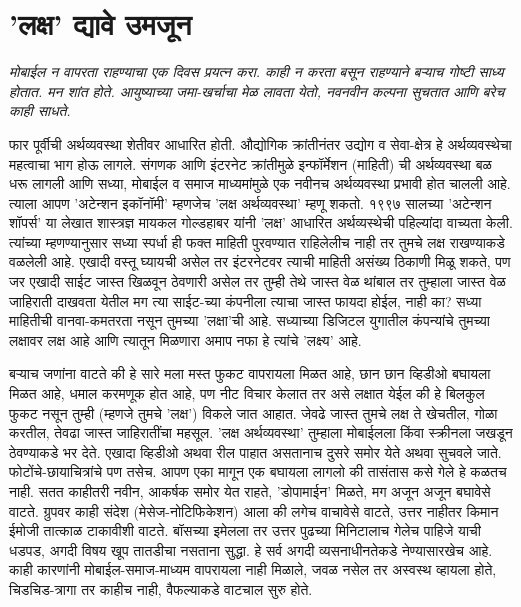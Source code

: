 \chapter{'लक्ष' द्यावे उमजून}

{\textit{मोबाईल न वापरता राहण्याचा एक दिवस प्रयत्न करा. काही न करता बसून राहण्याने बऱ्याच गोष्टी साध्य होतात. मन शांत होते. आयुष्याच्या जमा-खर्चाचा मेळ लावता येतो, नवनवीन कल्पना सुचतात आणि बरेच काही साधते.}}

\vspace{1.5em}

फार पूर्वीची अर्थव्यवस्था शेतीवर आधारित होती. औद्योगिक क्रांतीनंतर उद्योग व सेवा-क्षेत्र हे अर्थव्यवस्थेचा महत्वाचा भाग होऊ लागले. संगणक आणि इंटरनेट क्रांतीमुळे इन्फॉर्मेशन (माहिती) ची अर्थव्यवस्था बळ धरू लागली आणि सध्या, मोबाईल व समाज माध्यमांमुळे एक नवीनच अर्थव्यवस्था प्रभावी होत चालली आहे. त्याला आपण 'अटेन्शन इकॉनॉमी' म्हणजेच 'लक्ष अर्थव्यवस्था' म्हणू शकतो. १९९७ सालच्या 'अटेन्शन शॉपर्स' या लेखात शास्त्रज्ञ मायकल गोल्डहाबर यांनी 'लक्ष' आधारित अर्थव्यस्थेची पहिल्यांदा वाच्यता केली. त्यांच्या म्हणण्यानुसार सध्या स्पर्धा ही फक्त माहिती पुरवण्यात राहिलेलीच नाही तर तुमचे लक्ष राखण्याकडे वळलेली आहे. एखादी वस्तू घ्यायची असेल तर इंटरनेटवर त्याची माहिती असंख्य ठिकाणी मिळू शकते, पण जर एखादी साईट जास्त खिळवून ठेवणारी असेल तर तुम्ही तेथे जास्त वेळ थांबाल तर तुम्हाला जास्त वेळ जाहिराती दाखवता येतील मग त्या साईट-च्या कंपनीला त्याचा जास्त फायदा होईल, नाही का? सध्या माहितीची वानवा-कमतरता नसून तुमच्या 'लक्षा'ची आहे. सध्याच्या डिजिटल युगातील कंपन्यांचे तुमच्या लक्षावर लक्ष आहे आणि त्यातून मिळणारा अमाप नफा हे त्यांचे 'लक्ष्य' आहे.

बऱ्याच जणांना वाटते की हे सारे मला मस्त फुकट वापरायला मिळत आहे, छान छान व्हिडीओ बघायला मिळत आहे, धमाल करमणूक होत आहे, पण नीट विचार केलात तर असे लक्षात येईल की हे बिलकुल फुकट नसून तुम्ही (म्हणजे तुमचे 'लक्ष') विकले जात आहात. जेवढे जास्त तुमचे लक्ष ते खेचतील, गोळा करतील, तेवढा जास्त जाहिरातींचा महसूल. 'लक्ष अर्थव्यवस्था' तुम्हाला मोबाईलला किंवा स्क्रीनला जखडून ठेवण्याकडे भर देते. एखादा व्हिडीओ अथवा रील पाहात असतानाच दुसरे समोर येते अथवा सुचवले जाते. फोटोंचे-छायाचित्रांचे पण तसेच. आपण एका मागून एक बघायला लागलो की तासंतास कसे गेले हे कळतच नाही. सतत काहीतरी नवीन, आकर्षक समोर येत राहते, 'डोपामाईन' मिळते, मग अजून अजून बघावेसे वाटते. ग्रुपवर काही संदेश (मेसेज-नोटिफिकेशन) आला की लगेच वाचावेसे वाटते, उत्तर नाहीतर किमान ईमोजी तात्काळ टाकावीशी वाटते. बॉसच्या इमेलला तर उत्तर पुढच्या मिनिटालाच गेलेच पाहिजे याची धडपड, अगदी विषय खूप तातडीचा नसताना सुद्धा. हे सर्व अगदी व्यसनाधीनतेकडे नेण्यासारखेच आहे. काही कारणांनी मोबाईल-समाज-माध्यम वापरायला नाही मिळाले, जवळ नसेल तर अस्वस्थ व्हायला होते, चिडचिड-त्रागा तर काहीच नाही, वैफल्याकडे वाटचाल सुरु होते.

